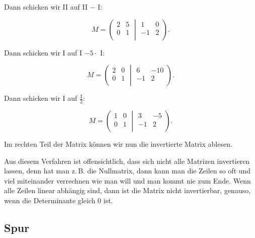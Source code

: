 \documentclass{scrartcl}
\begin{document}
Dann schicken wir II auf II $ - $ I:

\begin{equation}
	M = \left(\begin{matrix}
		2 & 5 \\
		0 & 1 \\
	\end{matrix}
	\middle\vert
	\begin{matrix}
		1 & 0 \\
		-1 & 2\\
	\end{matrix}\right).
\end{equation}

Dann schicken wir I auf I $ - 5\cdot $ I:

\begin{equation}
	M = \left(\begin{matrix}
		2 & 0 \\
		0 & 1 \\
	\end{matrix}
	\middle\vert
	\begin{matrix}
		6 & -10 \\
		-1 & 2\\
	\end{matrix}\right).
\end{equation}

Dann schicken wir I auf $\frac{\mathrm{I}}{2}$:

\begin{equation}
	M = \left(\begin{matrix}
		1 & 0 \\
		0 & 1 \\
	\end{matrix}
	\middle\vert
	\begin{matrix}
		3 & -5 \\
		-1 & 2\\
	\end{matrix}\right).
\end{equation}

Im rechten Teil der Matrix können wir nun die invertierte Matrix ablesen.

Aus diesem Verfahren ist offensichtlich, dass sich nicht alle Matrizen invertieren lassen, denn hat man z.\,B. die Nullmatrix,
dann kann man die Zeilen so oft und viel miteinander verrechnen wie man will und man kommt nie zum Ende. Wenn alle Zeilen
linear abhängig sind, dann ist die Matrix nicht invertierbar, genauso, wenn die Determinante gleich 0 ist.

\subsection{Spur}
\end{document}
